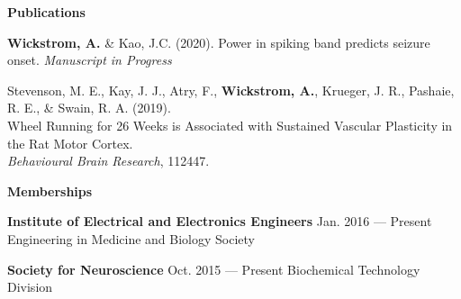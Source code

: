 \documentclass[10pt, oneside]{article}
\begin{document}


{\Large \textbf{Publications}} \hrulefill

\textbf{Wickstrom, A.} \& Kao, J.C. (2020).  Power in spiking band predicts seizure onset. \textit{Manuscript in Progress}

Stevenson, M. E., Kay, J. J., Atry, F., \textbf{Wickstrom, A.}, Krueger, J. R., Pashaie, R. E., \& Swain, R. A. (2019).\\ Wheel Running for 26 Weeks is Associated with Sustained Vascular Plasticity in the Rat Motor Cortex. \\ \textit{Behavioural Brain Research}, 112447.

\begin{comment}
\textbf{Wickstrom, A.}, Lyttle, D. \& Diba, K. (2020). Forward and reverse replay in a recurrent network with STDP. (2020).\\
\end{comment}
{\Large \textbf{Memberships}} \hrulefill %

 \textbf{Institute of Electrical and Electronics Engineers} \hfill{Jan. 2016 --- Present}\newline
	 \phantom{9mm} Engineering in Medicine and Biology Society 

	 \textbf{Society for Neuroscience} \hfill{Oct. 2015 --- Present} \newline
	 \phantom{9mm} Biochemical Technology Division
	 
\end{document}
